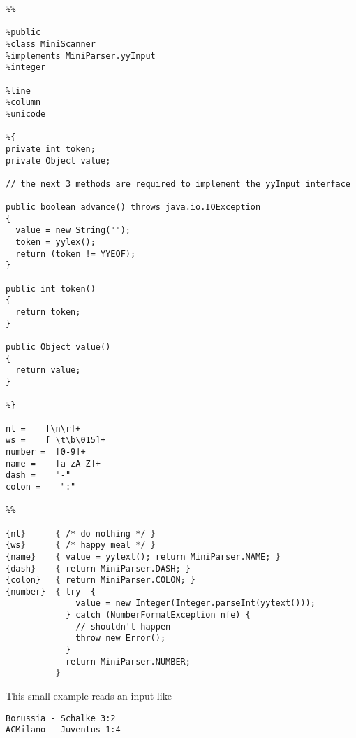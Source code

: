 \begin{verbatim}
%%

%public
%class MiniScanner
%implements MiniParser.yyInput
%integer

%line
%column
%unicode

%{
private int token;
private Object value;

// the next 3 methods are required to implement the yyInput interface

public boolean advance() throws java.io.IOException
{
  value = new String("");
  token = yylex();
  return (token != YYEOF);
}

public int token()
{
  return token;
}

public Object value() 
{
  return value;
}

%}

nl =    [\n\r]+
ws =    [ \t\b\015]+
number =  [0-9]+
name =    [a-zA-Z]+
dash =    "-"
colon =    ":"

%%

{nl}      { /* do nothing */ }
{ws}      { /* happy meal */ }
{name}    { value = yytext(); return MiniParser.NAME; }
{dash}    { return MiniParser.DASH; }
{colon}   { return MiniParser.COLON; }
{number}  { try  {
              value = new Integer(Integer.parseInt(yytext()));
            } catch (NumberFormatException nfe) {
              // shouldn't happen
              throw new Error();
            }
            return MiniParser.NUMBER;
          }
\end{verbatim}

This small example reads an input like

\begin{verbatim}
Borussia - Schalke 3:2
ACMilano - Juventus 1:4
\end{verbatim}
